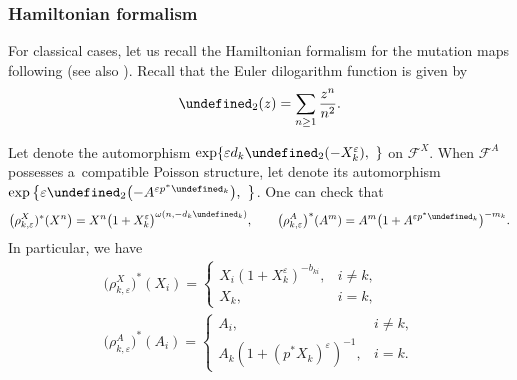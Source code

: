 \documentclass[10pt,a4paper]{amsart}
\newcommand{\opname}[1]{\operatorname{\mathsf{#1}}}
\newcommand{\cF}{{\mathcal F}}
\let\Li\undefined
\let\ee\undefined
\newcommand{\Li}{\opname{Li}}
\newcommand{\ee}{\mathbf{e}}
\numberwithin{equation}{section}
\begin{document}
\subsubsection*{Hamiltonian formalism}

For classical cases, let us recall the Hamiltonian formalism for the mutation maps following
\cite{gekhtman2017hamiltonian} (see also \cite{FockGoncharov09a,gross2018canonical}). Recall that the Euler dilogarithm function
is given by
\begin{align*}
\Li_{2}(z) =\sum_{n\geq1}\frac{z^{n}}{n^{2}}.
\end{align*}

Let  denote the automorphism $\exp\{\varepsilon d_{k}\Li_{2}(-X_{k}^{\varepsilon}),\ \}$
on $\cF^{X}$. When $\cF^{A}$ possesses a~compatible Poisson structure,
let  denote its automorphism $\exp\big\{\varepsilon\Li_{2}\bigl(-A^{\varepsilon p^{*}\ee_{k}}\bigr),\ \big\}$.
One can check that
\begin{gather*}
\big(\rho_{k,\varepsilon}^{X})^{*}(X^{n}\big) = X^{n}\big(1+X_{k}^{\varepsilon}\big)^{\omega(n,-d_{k}\ee_{k})},\qquad
\big(\rho_{k,\varepsilon}^{A}\big)^{*}(A^{m}) = A^{m}\big(1+A^{\varepsilon p^{*}\ee_{k}}\big)^{-m_{k}}.
\end{gather*}
In particular, we have
\begin{gather*}
\big(\rho_{k,\varepsilon}^{X}\big)^{*}(X_{i}) = \begin{cases}
X_{i}(1+X_{k}^{\varepsilon})^{-b_{ki}}, & i\neq k,\\
X_{k}, & i=k,
\end{cases}\\
\big(\rho_{k,\varepsilon}^{A}\big)^{*}(A_{i}) = \begin{cases}
A_{i}, & i\neq k,\\
A_{k}(1+(p^{*}X_{k})^{\varepsilon})^{-1}, & i=k.
\end{cases}
\end{gather*}
\end{document}
